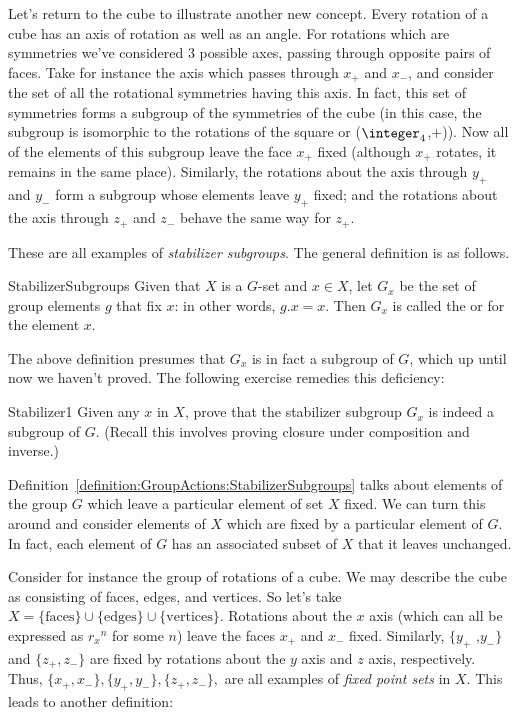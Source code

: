 Let's return to the cube to illustrate another new concept. Every rotation of a cube has an axis of rotation as well as an angle.   
 For rotations which are symmetries we've considered 3 possible axes, passing through opposite pairs of faces. 
Take for instance the axis which passes through $x_+$ and $x_-$, and consider the set of all the rotational symmetries having this axis.
In fact, this set of symmetries forms a subgroup  of the symmetries of the cube (in this case, the subgroup is isomorphic to the rotations of the square or ($\integer_4$,+)). Now all of the elements of this subgroup leave the face  $x_+$ fixed (although $x_+$ rotates, it remains in the same place).
Similarly, the rotations about the axis through $y_+$ and $y_-$ form a subgroup whose elements leave  $y_+$ fixed; and the rotations about the axis through $z_+$ and $z_-$ behave the same way for $z_+$.  

 These are all examples of \emph{stabilizer subgroups}. The general definition is as follows.

\begin{defn}{StabilizerSubgroups} 
Given that $X$ is a $G$-set and  $x \in X$, let $G_x$ be the set of  group elements $g$ that fix $x$:  in other words, $g.x=x$.  Then $G_x$ is called the  or  for the element $x$.
\end{defn}

The above definition presumes that $G_x$ is in fact a subgroup of $G$, which up until now we haven't proved. The following exercise remedies this deficiency:

\begin{exercise}{Stabilizer1}
Given any $x$ in $X$, prove that the stabilizer subgroup $G_x$  is indeed a subgroup of $G$.  (Recall this involves proving closure under composition and inverse.)
\end {exercise}

Definition~\ref{definition:GroupActions:StabilizerSubgroups} talks about elements of the group $G$ which leave a particular element of set $X$ fixed. We can turn this around and consider elements of $X$ which are fixed by a particular element of $G$. In fact, each element of $G$ has an associated subset of $X$ that it leaves unchanged. 

Consider for instance the group of rotations of a cube. We may describe the cube as consisting of faces, edges, and vertices. So let's take   $X=\{\text{faces}\}\cup\{\text{edges}\}\cup\{\text{vertices}\}$.  Rotations about the $x$ axis (which can all be expressed as ${r_x}^n$ for some $n$) leave the faces $x_+$ and $x_-$ fixed. Similarly, $\{y_+$ ,$y_-\}$ and $\{z_+,z_-\}$ are  fixed by rotations about the $y$ axis and $z$ axis, respectively.   Thus, $\{x_+,x_-\},\{y_+,y_-\},\{z_+,z_-\},$  are all examples of \emph{fixed point sets} in $X$.
This leads to another definition:

